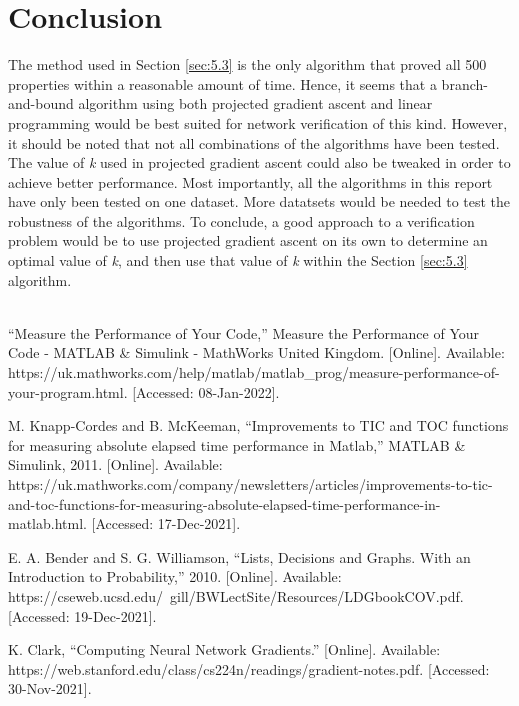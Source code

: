 \documentclass[11pt]{article}
\begin{document}
\section{Conclusion}
\label{sec:conclusion}
The method used in Section \ref{sec:5.3} is the only algorithm that proved all 500 properties within a reasonable amount of time. Hence, it seems that a branch-and-bound algorithm using both projected gradient ascent and linear programming would be best suited for network verification of this kind. However, it should be noted that not all combinations of the algorithms have been tested. The value of \emph{k} used in projected gradient ascent could also be tweaked in order to achieve better performance. Most importantly, all the algorithms in this report have only been tested on one dataset. More datatsets would be needed to test the robustness of the algorithms. To conclude, a good approach to a verification problem would be to use projected gradient ascent on its own to determine an optimal value of \emph{k}, and then use that value of \emph{k} within the Section \ref{sec:5.3} algorithm.
\\
\\
\begin{thebibliography}{9}

“Measure the Performance of Your Code,” Measure the Performance of Your Code - MATLAB \& Simulink - MathWorks United Kingdom. [Online]. Available: https://uk.mathworks.com/help/matlab/matlab\_prog/measure-performance-of-your-program.html. [Accessed: 08-Jan-2022]. 

M. Knapp-Cordes and B. McKeeman, “Improvements to TIC and TOC functions for measuring absolute elapsed time performance in Matlab,” MATLAB \& Simulink, 2011. [Online]. Available: https://uk.mathworks.com/company/newsletters/articles/improvements-to-tic-and-toc-functions-for-measuring-absolute-elapsed-time-performance-in-matlab.html. [Accessed: 17-Dec-2021]. 

E. A. Bender and S. G. Williamson, “Lists, Decisions and Graphs. With an Introduction to Probability,” 2010. [Online]. Available: https://cseweb.ucsd.edu/~gill/BWLectSite/Resources/LDGbookCOV.pdf. [Accessed: 19-Dec-2021]. 

K.  Clark, “Computing Neural Network Gradients.” [Online]. Available: 
\\
https://web.stanford.edu/class/cs224n/readings/gradient-notes.pdf. [Accessed: 30-Nov-2021]. 
\end{thebibliography}
\end{document}
